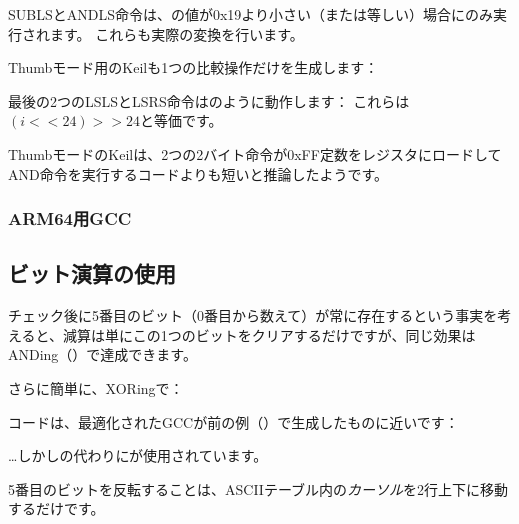 

SUBLSとANDLS命令は、の値が0x19より小さい（または等しい）場合にのみ実行されます。
これらも実際の変換を行います。

Thumbモード用の\Optimizing Keilも1つの比較操作だけを生成します：



最後の2つのLSLSとLSRS命令はのように動作します：
これらは$(i<<24)>>24$と等価です。

ThumbモードのKeilは、2つの2バイト命令が0xFF定数をレジスタにロードしてAND命令を実行するコードよりも短いと推論したようです。

\subsubsection{ARM64用GCC}





\subsection{ビット演算の使用}
\label{toupper_bit}

チェック後に5番目のビット（0番目から数えて）が常に存在するという事実を考えると、減算は単にこの1つのビットをクリアするだけですが、同じ効果はANDing（）で達成できます。

さらに簡単に、XORingで：



コードは、最適化されたGCCが前の例（）で生成したものに近いです：



\dots しかしの代わりにが使用されています。

5番目のビットを反転することは、\ac{ASCII}テーブル内の\textit{カーソル}を2行上下に移動するだけです。

